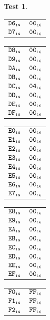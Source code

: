 \documentclass[a4paper,12pt]{article}
\makeatletter
\newcommand{\num}[1]{\texttt{#1}}
\newcommand{\hex}[1]{\num{#1}_{\textup{\tiny 16}}}
\newcommand{\MEM}[1]{\ifthenelse{\equal{#1}{}}{M}{M[#1]}}
\theoremstyle{definition}
\newtheorem{test}{Test}
\newenvironment{memtable}{%
  \begin{trivlist}
    \item
    }{%
    \end{trivlist}}
\newenvironment{memcolumn}{%
  \begin{tabular}{@{}ll@{}}
    \hline}
    {%
    \hline
  \end{tabular}}
\newcommand{\memspace}{\qquad}
\makeatother
\begin{document}
\begin{test}
\begin{memtable}
\begin{memcolumn}
      $\hex{D6}$ & $\hex{00}$ \\
      $\hex{D7}$ & $\hex{00}$ \\
    \end{memcolumn}
    \memspace
    \begin{memcolumn}
      $\hex{D8}$ & $\hex{00}$ \\
      $\hex{D9}$ & $\hex{00}$ \\
      $\hex{DA}$ & $\hex{00}$ \\
      $\hex{DB}$ & $\hex{00}$ \\
      $\hex{DC}$ & $\hex{04}$ \\
      $\hex{DD}$ & $\hex{00}$ \\
      $\hex{DE}$ & $\hex{00}$ \\
      $\hex{DF}$ & $\hex{00}$ \\
    \end{memcolumn}
    \memspace
    \begin{memcolumn}
      $\hex{E0}$ & $\hex{00}$ \\
      $\hex{E1}$ & $\hex{00}$ \\
      $\hex{E2}$ & $\hex{00}$ \\
      $\hex{E3}$ & $\hex{00}$ \\
      $\hex{E4}$ & $\hex{00}$ \\
      $\hex{E5}$ & $\hex{00}$ \\
      $\hex{E6}$ & $\hex{00}$ \\
      $\hex{E7}$ & $\hex{00}$ \\
    \end{memcolumn}
    \memspace
    \begin{memcolumn}
      $\hex{E8}$ & $\hex{00}$ \\
      $\hex{E9}$ & $\hex{00}$ \\
      $\hex{EA}$ & $\hex{00}$ \\
      $\hex{EB}$ & $\hex{00}$ \\
      $\hex{EC}$ & $\hex{00}$ \\
      $\hex{ED}$ & $\hex{00}$ \\
      $\hex{EE}$ & $\hex{00}$ \\
      $\hex{EF}$ & $\hex{00}$ \\
    \end{memcolumn}
    \memspace
    \begin{memcolumn}
      $\hex{F0}$ & $\hex{FF}$ \\
      $\hex{F1}$ & $\hex{FF}$ \\
      $\hex{F2}$ & $\hex{FF}$ \\

\end{memcolumn}
\end{memtable}
\end{test}
\end{document}
